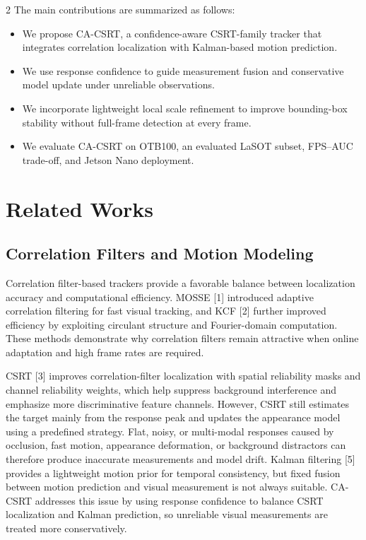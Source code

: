 \documentclass[10pt,a4paper]{article}
\begin{document}
\begin{multicols}{2}
The main contributions are summarized as follows:
\vspace{-0.4em}
\begin{itemize}
    \setlength{\itemsep}{0.1em}
    \setlength{\parskip}{0pt}
    \setlength{\parsep}{0pt}
    \setlength{\topsep}{0.1em}
    \item We propose CA-CSRT, a confidence-aware CSRT-family tracker that integrates correlation localization with Kalman-based motion prediction.
    \item We use response confidence to guide measurement fusion and conservative model update under unreliable observations.
    \item We incorporate lightweight local scale refinement to improve bounding-box stability without full-frame detection at every frame.
    \item We evaluate CA-CSRT on OTB100, an evaluated LaSOT subset, FPS--AUC trade-off, and Jetson Nano deployment.
\end{itemize}

\section{Related Works}

\subsection{Correlation Filters and Motion Modeling}

Correlation filter-based trackers provide a favorable balance between localization accuracy and computational efficiency. MOSSE [1] introduced adaptive correlation filtering for fast visual tracking, and KCF [2] further improved efficiency by exploiting circulant structure and Fourier-domain computation. These methods demonstrate why correlation filters remain attractive when online adaptation and high frame rates are required.

CSRT [3] improves correlation-filter localization with spatial reliability masks and channel reliability weights, which help suppress background interference and emphasize more discriminative feature channels. However, CSRT still estimates the target mainly from the response peak and updates the appearance model using a predefined strategy. Flat, noisy, or multi-modal responses caused by occlusion, fast motion, appearance deformation, or background distractors can therefore produce inaccurate measurements and model drift. Kalman filtering [5] provides a lightweight motion prior for temporal consistency, but fixed fusion between motion prediction and visual measurement is not always suitable. CA-CSRT addresses this issue by using response confidence to balance CSRT localization and Kalman prediction, so unreliable visual measurements are treated more conservatively.


\end{multicols}
\end{document}
